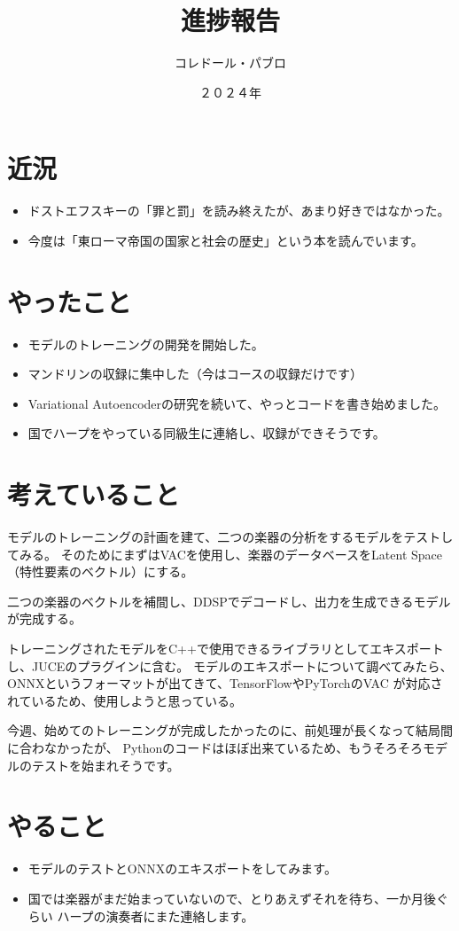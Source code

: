 \documentclass[a4paper, 12pt]{article}
\title{進捗報告}
\author{コレドール・パブロ}
\date{２０２４年}
\begin{document}
\maketitle

\section*{近況}
\begin{itemize}
    \item ドストエフスキーの「罪と罰」を読み終えたが、あまり好きではなかった。
    \item 今度は「東ローマ帝国の国家と社会の歴史」という本を読んでいます。
\end{itemize} 

\section*{やったこと}
\begin{itemize}
    \item モデルのトレーニングの開発を開始した。
    \item マンドリンの収録に集中した（今はコースの収録だけです）
    \item Variational Autoencoderの研究を続いて、やっとコードを書き始めました。\cite{autoencoder_tutorial}
    \item 国でハープをやっている同級生に連絡し、収録ができそうです。
\end{itemize}

\section*{考えていること}

モデルのトレーニングの計画を建て、二つの楽器の分析をするモデルをテストしてみる。
そのためにまずはVACを使用し、楽器のデータベースをLatent Space（特性要素のベクトル）にする。\cite{latent_space}

二つの楽器のベクトルを補間し、DDSPでデコードし、出力を生成できるモデルが完成する。

トレーニングされたモデルをC++で使用できるライブラリとしてエキスポートし、JUCEのプラグインに含む。
モデルのエキスポートについて調べてみたら、ONNXというフォーマットが出てきて、TensorFlowやPyTorchのVAC
が対応されているため、使用しようと思っている。

今週、始めてのトレーニングが完成したかったのに、前処理が長くなって結局間に合わなかったが、
Pythonのコードはほぼ出来ているため、もうそろそろモデルのテストを始まれそうです。

\section*{やること}
\begin{itemize}
    \item モデルのテストとONNXのエキスポートをしてみます。
    \item 国では楽器がまだ始まっていないので、とりあえずそれを待ち、一か月後ぐらい
    ハープの演奏者にまた連絡します。
\end{itemize}



\end{document}
